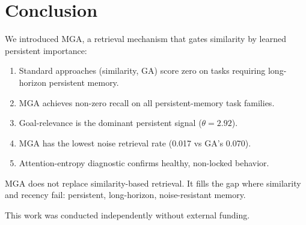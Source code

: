 \documentclass{article}
\begin{document}
\section{Conclusion}

We introduced MGA, a retrieval mechanism that gates similarity by learned persistent importance:
\begin{enumerate}[leftmargin=2em,itemsep=2pt]
\item Standard approaches (similarity, GA) score zero on tasks requiring long-horizon persistent memory.
\item MGA achieves non-zero recall on all persistent-memory task families.
\item Goal-relevance is the dominant persistent signal ($\theta = 2.92$).
\item MGA has the lowest noise retrieval rate (0.017 vs GA's 0.070).
\item Attention-entropy diagnostic confirms healthy, non-locked behavior.
\end{enumerate}

MGA does not replace similarity-based retrieval. It fills the gap where similarity and recency fail: persistent, long-horizon, noise-resistant memory.

\begin{ack}
This work was conducted independently without external funding.
\end{ack}



\end{document}
